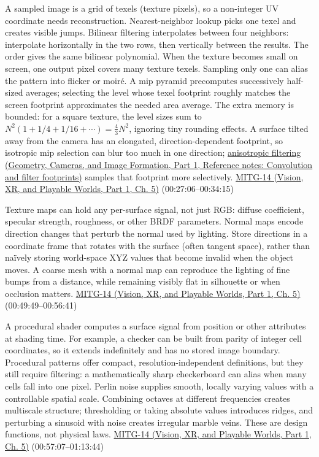 A sampled image is a grid of texels (texture pixels), so a non-integer UV coordinate needs reconstruction. Nearest-neighbor lookup picks one texel and creates visible jumps. Bilinear filtering interpolates between four neighbors: interpolate horizontally in the two rows, then vertically between the results. The order gives the same bilinear polynomial. When the texture becomes small on screen, one output pixel covers many texture texels. Sampling only one can alias the pattern into flicker or moiré. A mip pyramid precomputes successively half-sized averages; selecting the level whose texel footprint roughly matches the screen footprint approximates the needed area average. The extra memory is bounded: for a square texture, the level sizes sum to \(N^2(1+1/4+1/16+\cdots)=\frac43N^2\), ignoring tiny rounding effects. A surface tilted away from the camera has an elongated, direction-dependent footprint, so isotropic mip selection can blur too much in one direction; \href{../03-Geometry-Cameras-and-Image-Formation-P01/main.pdf\#appendix-d5b3c692d9f0}{anisotropic filtering (Geometry, Cameras, and Image Formation, Part 1, Reference notes: Convolution and filter footprints)} samples that footprint more selectively. \href{../07-Vision-XR-and-Playable-Worlds-P01/main.pdf\#04-visual-computing-ii-ch036-mitg-14---texture-mapping}{MITG-14 (Vision, XR, and Playable Worlds, Part 1, Ch. 5)} (00:27:06--00:34:15)

Texture maps can hold any per-surface signal, not just RGB: diffuse coefficient, specular strength, roughness, or other BRDF parameters. Normal maps encode direction changes that perturb the normal used by lighting. Store directions in a coordinate frame that rotates with the surface (often tangent space), rather than naïvely storing world-space XYZ values that become invalid when the object moves. A coarse mesh with a normal map can reproduce the lighting of fine bumps from a distance, while remaining visibly flat in silhouette or when occlusion matters. \href{../07-Vision-XR-and-Playable-Worlds-P01/main.pdf\#04-visual-computing-ii-ch036-mitg-14---texture-mapping}{MITG-14 (Vision, XR, and Playable Worlds, Part 1, Ch. 5)} (00:49:49--00:56:41)

A procedural shader computes a surface signal from position or other attributes at shading time. For example, a checker can be built from parity of integer cell coordinates, so it extends indefinitely and has no stored image boundary. Procedural patterns offer compact, resolution-independent definitions, but they still require filtering: a mathematically sharp checkerboard can alias when many cells fall into one pixel. Perlin noise supplies smooth, locally varying values with a controllable spatial scale. Combining octaves at different frequencies creates multiscale structure; thresholding or taking absolute values introduces ridges, and perturbing a sinusoid with noise creates irregular marble veins. These are design functions, not physical laws. \href{../07-Vision-XR-and-Playable-Worlds-P01/main.pdf\#04-visual-computing-ii-ch036-mitg-14---texture-mapping}{MITG-14 (Vision, XR, and Playable Worlds, Part 1, Ch. 5)} (00:57:07--01:13:44)

